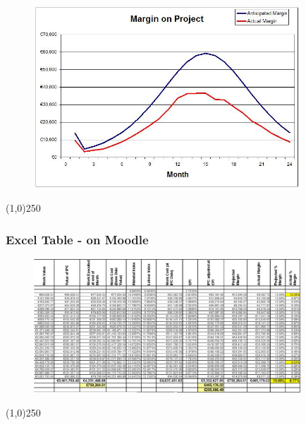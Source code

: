\begin{frame}
\frametitle{}
\begin{figure}
	\centering
		\includegraphics[width = 10cm]{images/margin2.jpg}
	\label{fig:margin2}
\end{figure}

\end{frame}
\begin{center}\line(1,0){250}\end{center}






\begin{frame}
\frametitle{Excel Table - on Moodle}
\begin{figure}
	\centering
		\includegraphics[width = 10cm]{images/rawdata.jpg}
	\label{fig:rawdata}
\end{figure}
\end{frame}
\begin{center}\line(1,0){250}\end{center}






